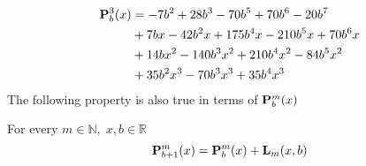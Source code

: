 \begin{equation*}
    \begin{split}
        {\mathbf{P}}\sp{3} \sb{b}(x)
        &=-7 b^2 + 28 b^3 - 70 b^5 + 70 b^6 - 20 b^7 \\
        &+ 7 b x - 42 b^2 x + 175 b^4 x - 210 b^5 x + 70 b^6 x \\
        &+ 14 b x^2 - 140 b^3 x^2 + 210 b^4 x^2 - 84 b^5 x^2 \\
        &+ 35 b^2 x^3 - 70 b^3 x^3 + 35 b^4 x^3
    \end{split}
\end{equation*}
The following property is also true in terms of ${\mathbf{P}}\sp{m} \sb{b}(x)$
\begin{ppty}
    \label{prop_p_identity}
    For every $m\in \mathbb{N}, \; x,b\in\mathbb{R}$
    \begin{equation*}
        {\mathbf{P}}\sp{m} \sb{b+1}(x) = {\mathbf{P}}\sp{m} \sb{b}(x) + {\mathbf{L}}\sb{m}(x,b)
    \end{equation*}
\end{ppty}
